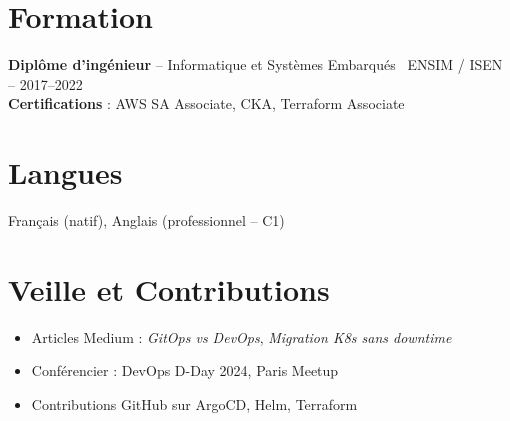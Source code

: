 \documentclass[a4paper,10pt]{article}
\begin{document}
\section*{Formation}
\textbf{Diplôme d'ingénieur} – Informatique et Systèmes Embarqués \
ENSIM / ISEN – 2017--2022  \\
\textbf{Certifications} : AWS SA Associate, CKA, Terraform Associate

\section*{Langues}
Français (natif), Anglais (professionnel – C1)

\section*{Veille et Contributions}
\begin{itemize}[leftmargin=*]
    \item Articles Medium : \textit{GitOps vs DevOps}, \textit{Migration K8s sans downtime}
    \item Conférencier : DevOps D-Day 2024, Paris Meetup
    \item Contributions GitHub sur ArgoCD, Helm, Terraform
\end{itemize}
\end{document}
